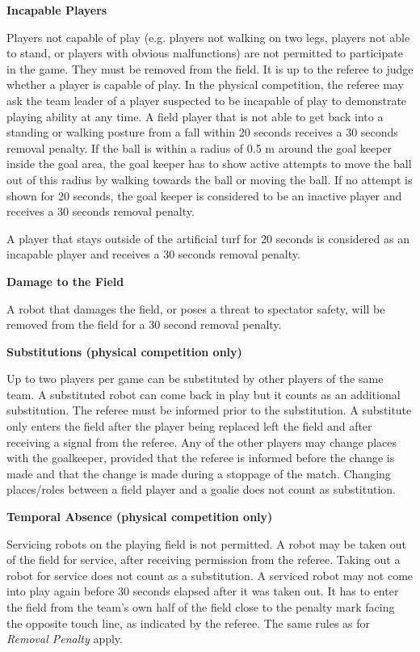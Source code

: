 \bigskip


{\bfseries Incapable Players}

Players not capable of play (e.g. players not walking on two legs,
players not able to stand, or players with obvious malfunctions)
are not permitted to participate in the game.
They must be removed from the field.
It is up to the referee to judge whether a player is capable of play.
In the physical competition, the referee may ask the team leader of a player suspected to be incapable of
play to demonstrate playing ability at any time.
A field player that is not able to get back into a standing or walking
posture from a fall within 20 seconds receives a 30
seconds removal penalty.
If the ball is within a radius of 0.5 m around the goal keeper inside the goal area,
the goal keeper has to show active attempts to move the ball out of this radius by walking towards the ball or moving the ball.
If no attempt is shown for 20 seconds, the goal keeper is considered to be an
inactive player and receives a 30 seconds removal penalty.

A player that stays outside of the artificial turf for 20 seconds is
  considered as an incapable player and receives a 30 seconds removal penalty.

\bigskip
 
{\bfseries Damage to the Field}

A robot that damages the field, or poses a threat to spectator safety, will be removed from the field for a 30 second removal penalty.

\bigskip

{\bfseries Substitutions (physical competition only)}

Up to two players per game can be substituted by other players of the same team.
A substituted robot can come back in play but it counts as an additional substitution.
The referee must be informed prior to the substitution.
A substitute only enters the field after the player being replaced left the
field and after receiving a signal from the referee.
Any of the other players may change places with the goalkeeper,
provided that the referee is informed before the change is made and that the
change is made during a stoppage of the match.
Changing places/roles between a field player and a goalie does not count as
substitution.

\bigskip

{\bfseries Temporal Absence (physical competition only)}

Servicing robots on the playing field is not permitted.
A robot may be taken out of the field for service,
after receiving permission from the referee.
Taking out a robot for service does not count as a substitution.
A serviced robot may not come into play again before 30 seconds elapsed after it
was taken out.
It has to enter the field from the team's own half of the field close to the
penalty mark facing the opposite touch line, as indicated by the referee.
The same rules as for \textit{Removal Penalty} apply.

